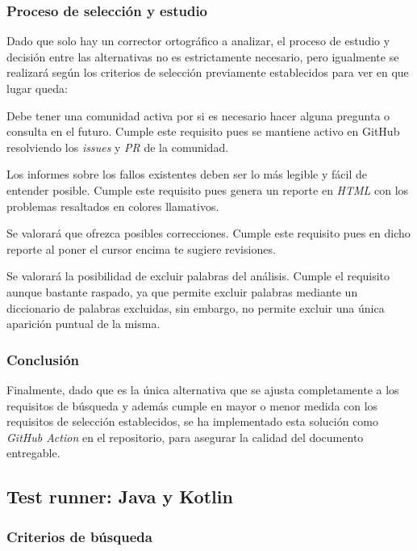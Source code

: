 \subsubsection{Proceso de selección y estudio}
Dado que solo hay un corrector ortográfico a analizar, el proceso de estudio y
decisión entre las alternativas no es estrictamente necesario, pero igualmente
se realizará según los criterios de selección previamente establecidos para ver
en que lugar queda: 

\begin{todolist}
    \item[\xcmark] Debe tener una comunidad activa por si es necesario hacer
    alguna pregunta o consulta en el futuro. Cumple este requisito pues se
    mantiene activo en GitHub resolviendo los \emph{issues} y \emph{PR} de la
    comunidad.
    \item[\xcmark] Los informes sobre los fallos existentes deben ser lo más
    legible y fácil de entender posible. Cumple este requisito pues genera un
    reporte en \emph{HTML} con los problemas resaltados en colores llamativos.
    \item[\xcmark] Se valorará que ofrezca posibles correcciones. Cumple este
    requisito pues en dicho reporte al poner el cursor encima te sugiere
    revisiones.
    \item[\xcmark] Se valorará la posibilidad de excluir palabras del análisis.
    Cumple el requisito aunque bastante raspado, ya que permite excluir palabras
    mediante un diccionario de palabras excluidas, sin embargo, no permite
    excluir una única aparición puntual de la misma.
\end{todolist}

\subsubsection{Conclusión}
Finalmente, dado que es la única alternativa que se ajusta completamente a los
requisitos de búsqueda y además cumple en mayor o menor medida con los
requisitos de selección establecidos, se ha implementado esta solución como
\emph{GitHub Action} en el repositorio, para asegurar la calidad del documento
entregable.

\subsection{Test runner: Java y Kotlin}

\subsubsection{Criterios de búsqueda}

